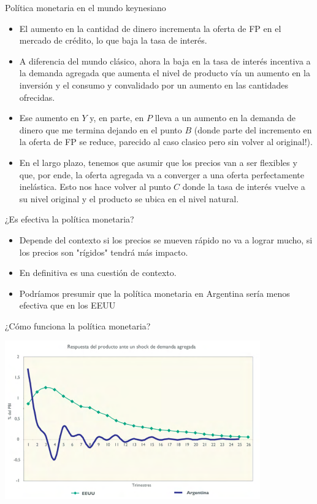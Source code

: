 \documentclass{beamer}
\begin{document}
\begin{frame}{Política monetaria en el mundo keynesiano}

\begin{itemize}
    \item El aumento en la cantidad de dinero incrementa la oferta de FP en el mercado de crédito, lo que baja la tasa de interés. 
    \item A diferencia del mundo clásico, ahora la baja en la tasa de interés incentiva a la demanda agregada que aumenta el nivel de producto vía un aumento en la inversión y el consumo y convalidado por un aumento en las cantidades ofrecidas. 
    \item Ese aumento en $Y$ y, en parte, en $P$ lleva a un aumento en la demanda de dinero que me termina dejando en el punto $B$ (donde parte del incremento en la oferta de FP se reduce, parecido al caso clasico pero sin volver al original!).
    \item En el largo plazo, tenemos que asumir que los precios van a ser flexibles y que, por ende, la oferta agregada va a converger a una oferta perfectamente inelástica. Esto nos hace volver al punto $C$ donde la tasa de interés vuelve a su nivel original y el producto se ubica en el nivel natural.
\end{itemize}
 

\end{frame}

\begin{frame}{¿Es efectiva la política monetaria?}

    \begin{itemize}
        \item Depende del contexto si los precios se mueven rápido no va a lograr mucho, si los precios son "rígidos" tendrá más impacto. 
        \item En definitiva es una cuestión de contexto.
        \item Podríamos presumir que la política monetaria en Argentina sería menos efectiva que en los EEUU

    \end{itemize}
    
\end{frame}

\begin{frame}{¿Cómo funciona la política monetaria?}
    
    \centering\includegraphics[width=11cm]{../Figures/C40.8.png}\

\end{frame}
\end{document}
